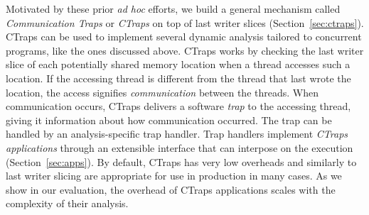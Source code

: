 \documentclass[preprint,9pt]{sigplanconf}
\newcommand{\ctraps}{CTraps\xspace}
\begin{document}
Motivated by these prior {\em ad hoc} efforts, we build a general mechanism
called {\em Communication Traps} or {\em \ctraps} on top of last writer slices
(Section~\ref{sec:ctraps}). \ctraps can be used to implement several dynamic
analysis tailored to concurrent programs, like the ones discussed above.
\ctraps works by checking the last writer slice of each potentially shared
memory location when a thread accesses such a location. If the accessing
thread is different from the thread that last wrote the location, the access
signifies {\em communication} between the threads. When communication occurs,
\ctraps delivers a software {\em trap} to the accessing thread, giving it
information about how communication occurred. The trap can be handled by an
analysis-specific trap handler. Trap handlers implement {\em \ctraps
applications} through an extensible interface that can interpose on the
execution (Section~\ref{sec:apps}). By default, \ctraps has very low overheads
and similarly to last writer slicing are appropriate for use in production in
many cases. 
As we show in our evaluation, the
overhead of \ctraps applications scales with the complexity of their analysis.



%
\end{document}
